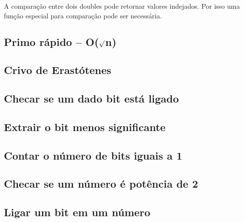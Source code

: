 \documentclass[a4paper,12pt]{article}
\begin{document}
A comparação entre dois doubles pode retornar valores indejados. Por isso uma função especial para comparação pode ser necessária.


\subsection{Primo rápido – O($\surd$n)}


\subsection{Crivo de Erastótenes}


\subsection{Checar se um dado bit está ligado}


\subsection{Extrair o bit menos significante}


\subsection{Contar o número de bits iguais a 1}


\subsection{Checar se um número é potência de 2}


\subsection{Ligar um bit em um número}

\end{document}
